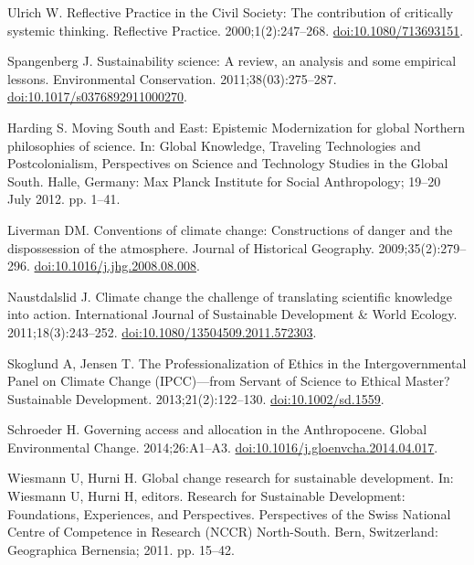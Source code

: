 \documentclass[10pt,a4paper]{article}
\begin{document}
\begin{multicols}{2}
\begin{footnotesize}
\begin{thebibliography}{10}
Ulrich W.
\newblock Reflective Practice in the Civil Society: The contribution of
  critically systemic thinking.
\newblock Reflective Practice. 2000;1(2):247--268.
\newblock \href{https://doi.org/10.1080/713693151}{doi:10.1080/713693151}.

Spangenberg J.
\newblock Sustainability science: A review, an analysis and some empirical
  lessons.
\newblock Environmental Conservation. 2011;38(03):275--287.
\newblock
  \href{https://doi.org/10.1017/s0376892911000270}{doi:10.1017/s0376892911000270}.

Harding S.
\newblock Moving South and East: Epistemic Modernization for global Northern
  philosophies of science.
\newblock In: Global Knowledge, Traveling Technologies and Postcolonialism,
  Perspectives on Science and Technology Studies in the Global South. Halle,
  Germany: Max Planck Institute for Social Anthropology; 19--20 July 2012. pp.
  1--41.

Liverman DM.
\newblock Conventions of climate change: Constructions of danger and the
  dispossession of the atmosphere.
\newblock Journal of Historical Geography. 2009;35(2):279--296.
\newblock
  \href{https://doi.org/10.1016/j.jhg.2008.08.008}{doi:10.1016/j.jhg.2008.08.008}.

Naustdalslid J.
\newblock Climate change {\textendash} the challenge of translating scientific
  knowledge into action.
\newblock International Journal of Sustainable Development {\&} World Ecology.
  2011;18(3):243--252.
\newblock
  \href{https://doi.org/10.1080/13504509.2011.572303}{doi:10.1080/13504509.2011.572303}.

Skoglund A, Jensen T.
\newblock The Professionalization of Ethics in the Intergovernmental Panel on
  Climate Change ({IPCC})---from Servant of Science to Ethical Master?
\newblock Sustainable Development. 2013;21(2):122--130.
\newblock \href{https://doi.org/10.1002/sd.1559}{doi:10.1002/sd.1559}.

Schroeder H.
\newblock Governing access and allocation in the Anthropocene.
\newblock Global Environmental Change. 2014;26:A1--A3.
\newblock
  \href{https://doi.org/10.1016/j.gloenvcha.2014.04.017}{doi:10.1016/j.gloenvcha.2014.04.017}.

Wiesmann U, Hurni H.
\newblock Global change research for sustainable development.
\newblock In: Wiesmann U, Hurni H, editors. Research for Sustainable
  Development: Foundations, Experiences, and Perspectives. Perspectives of the
  Swiss National Centre of Competence in Research (NCCR) North-South. Bern,
  Switzerland: Geographica Bernensia; 2011. pp. 15--42.


\end{thebibliography}
\end{footnotesize}
\end{multicols}
\end{document}
